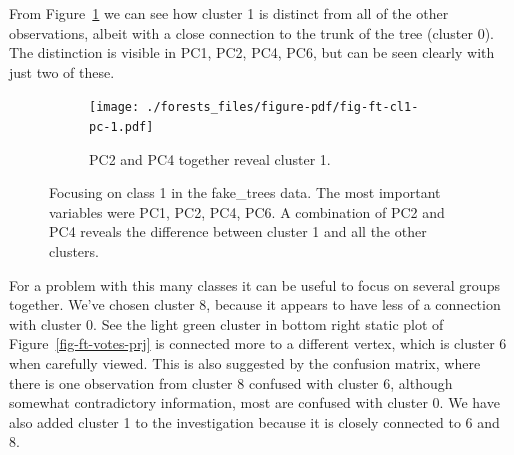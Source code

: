 \documentclass[
  letterpaper,
]{book}
\begin{document}
From Figure~\ref{fig-ft-cl} we can see how cluster 1 is distinct from
all of the other observations, albeit with a close connection to the
trunk of the tree (cluster 0). The distinction is visible in PC1, PC2,
PC4, PC6, but can be seen clearly with just two of these.

\begin{figure}

\begin{minipage}[t]{0.50\linewidth}

{\centering 

}

\end{minipage}%
%
\begin{minipage}[t]{0.50\linewidth}

{\centering 

\begin{figure}

{\centering \texttt{[image: ./forests\_files/figure-pdf/fig-ft-cl1-pc-1.pdf]}

}

\caption{PC2 and PC4 together reveal cluster 1.}

\end{figure}

}

\end{minipage}%

\caption{\label{fig-ft-cl}Focusing on class 1 in the fake\_trees data.
The most important variables were PC1, PC2, PC4, PC6. A combination of
PC2 and PC4 reveals the difference between cluster 1 and all the other
clusters.}

\end{figure}

For a problem with this many classes it can be useful to focus on
several groups together. We've chosen cluster 8, because it appears to
have less of a connection with cluster 0. See the light green cluster in
bottom right static plot of Figure~\ref{fig-ft-votes-prj} is connected
more to a different vertex, which is cluster 6 when carefully viewed.
This is also suggested by the confusion matrix, where there is one
observation from cluster 8 confused with cluster 6, although somewhat
contradictory information, most are confused with cluster 0. We have
also added cluster 1 to the investigation because it is closely
connected to 6 and 8.
\end{document}
